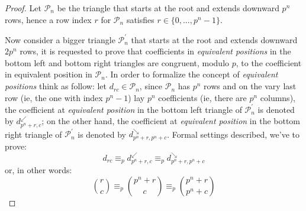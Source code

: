 \documentclass[11pt,a4paper]{article} %
\begin{document}
    \begin{proof}
      Let $\mathcal{P}_n$ be the triangle that starts at the root and
      extends downward $p^n$ rows, hence a row index $r$ for
      $\mathcal{P}_n$ satisfies
      $r \in \lbrace 0, \ldots, p^n -1 \rbrace$.
        
      Now consider a bigger triangle $\mathcal{P}_n^\prime$ that
      starts at the root and extends downward $2p^n$ rows, it is
      requested to prove that coefficients in \emph{equivalent
        positions} in the bottom left and bottom right triangles are
      congruent, modulo $p$, to the coefficient in equivalent position
      in $\mathcal{P}_n$. In order to formalize the concept of
      \emph{equivalent positions} think as follow: let
      $d_{rc}\in\mathcal{P}_n$, since $\mathcal{P}_{n}$ has $p^n$ rows
      and on the vary last row (ie, the one with index $p^n-1$) lay
      $p^n$ coefficients (ie, there are $p^n$ columns), the
      coefficient at \emph{equivalent position} in the bottom left
      triangle of $\mathcal{P}_{n}^\prime$ is denoted by
      $d_{p^n+r, c}^{\swarrow}$; on the other hand, the coefficient at
      \emph{equivalent position} in the bottom right triangle of
      $\mathcal{P}_{n}^\prime$ is denoted by
      $d_{p^n+r, p^n+c}^{\searrow}$.  Formal settings described, we've
      to prove:
      \begin{displaymath}
        d_{rc} \equiv_p d_{p^n+r,c}^{\swarrow} \equiv_p d_{p^n+r,p^n+c}^{\searrow} 
      \end{displaymath}
      or, in other words:
      \begin{displaymath}
        {{r} \choose {c}} \equiv_p {{p^n+r} \choose {c}} \equiv_p {{p^n+r} \choose {p^n+c}} 
      \end{displaymath}


\end{proof}
\end{document}
